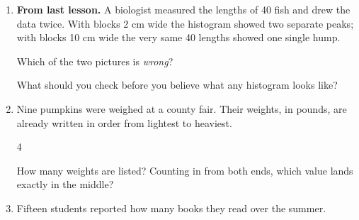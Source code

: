 \documentclass[12pt]{article}
\begin{document}

\vspace{0.20in}

\begin{enumerate}[leftmargin=1.9em, itemsep=0.42in]

  \item \textbf{From last lesson.} A biologist measured the lengths of 40 fish and drew the
        data twice. With blocks 2 cm wide the histogram showed two separate peaks; with blocks
        10 cm wide the very same 40 lengths showed one single hump.

        \vspace{10pt}
        Which of the two pictures is \emph{wrong}? \blank{3.4cm}

        \vspace{14pt}
        What should you check before you believe what any histogram looks like?
        \blank{4.6cm}

  \item Nine pumpkins were weighed at a county fair. Their weights, in pounds, are already
        written in order from lightest to heaviest.

        \vspace{10pt}
        \begin{center}
        4        
        \end{center}
        \vspace{10pt}

        How many weights are listed? \blank{1.6cm} \qquad
        Counting in from both ends, which value lands exactly in the middle? \blank{1.6cm}

  \item Fifteen students reported how many books they read over the summer.

        \vspace{4pt}
        \begin{center}
        \end{center}
        \vspace{4pt}


\end{enumerate}
\end{document}
